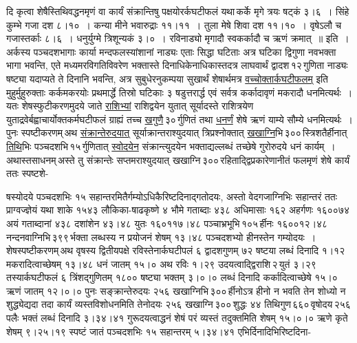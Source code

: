 \documentclass[11pt, openany]{book}
\begin{document}
\newpage

\begin{sloppypar}
\noindent दि कृत्वा शेषैस्तिथिवद्धनमृणं वा कार्यं संक्रान्तिषु पक्षयोरर्कघटीफलं यथा\textendash \,कर्के मृगे त्रयः षट्कं ३।६~। सिंहे कुम्भे गजा दश ८।१०~। कन्या मीने भवारुद्राः ११।११~। तुला मेषे शिवा दश ११।१०~। वृषेऽलौ च गजास्तर्काः ८।६~। धनुर्युग्मे त्रिशून्यकं ३।०~। रविनाड्यो मृगादौ स्वकर्कादौ च ऋणं क्रमात्~॥ इति~। अर्कस्य पञ्चदशभागाः कार्या मन्दफलस्यांशानां नाड्यः एताः सिद्धा घटिताः अत्र घटिका द्विगुणा नवभक्ता भागा भवन्ति, एते मध्यमरविगतिविवरेण भक्तास्ते दिनाधिकेनाधिकास्तदत्र लाघवार्थं द्वादश\textendash \,१२\textendash \,गुणिता नाड्यः षष्ट्या यदाप्यते ते दिनानि भवन्ति, अत्र सुबुधेरनुकम्पया सुखार्थं शेषार्थमत्र \hyperref[6.2]{वच्चोक्तार्कघटीफलम्} इति मुहुर्मुहुरुक्ताः कर्कमकरयोः प्रथमार्द्धे तिस्रो घटिकाः ३ षडुत्तरार्द्ध एवं सर्वत्र कर्कादावृणं मकरादौ धनमित्यर्थः~। यतः शेषस्फुटीकरणमुदये जाते \hyperref[6.2]{राशिभ्यां} राशिद्वयेन युतात् सूर्यादस्ते राशित्रयेण युताद्रवेर्बह्वाचार्योक्तकर्मघटीफलं ग्राह्यं तच्च \hyperref[6.2]{खगुणै}\textendash \,३०\textendash \,र्गुणितं तथा \hyperref[6.2]{धनर्णं} शेषे ऋणं याम्ये सौम्ये धनमित्यर्थः~। पुनः स्पष्टीकरणम्\textendash \,अथ \hyperref[6.2]{संक्रान्तेरुदयात्} सूर्याक्रान्तराश्युदयात् त्रिप्रश्नोक्तात् \hyperref[6.2]{खखाग्नि}भि\textendash \,३००\textendash \,स्त्रिशतैर्हीनात् \hyperref[6.2]{तिथि}भिः पञ्चदशभि\textendash \,१५\textendash \,र्गुणितात् \hyperref[6.2]{स्वोदयेन} संक्रान्त्युदयेन भक्ताद्यल्लब्धं तच्छेषे गुरोरुदये धनं कार्यम्~। अथास्तसाधनम्\textendash \,अस्ते तु संक्रान्तेः सप्तमराश्युदयात् खखाग्नि\textendash \,३००\textendash \,रहिताद्द्विप्रकारेणानीतं फलमृणं शेषे कार्यं ततः स्पष्टशे-
\end{sloppypar}

\newpage

\begin{sloppypar}
\noindent षस्योदये पञ्चदशभिः १५ सहान्तरमितैर्गम्योऽधिकैरिष्टदिनाद्गतोदयः, अस्तो वेदगजाग्निभिः सहान्तरं ततः प्राग्वज्ज्ञेयं यथा शाके १५४३ लौकिका-षाढकृष्णे ४ भौमे गताब्दाः ४३८ अधिमासाः १६२ अहर्गणः १६००७४ अयं गताब्दानां ४३८ दशांशेन ४३।४८ युतः १६०११७।४८ पञ्चाभ्रभूभि\textendash \,१०५\textendash \,र्हीनः १६००१२।४८ नन्दनवाग्निभि\textendash \,३९९\textendash \,र्भक्ता लब्धस्य न प्रयोजनं शेषम् १३।४८ पञ्चदशभ्यो हीनस्तेन गम्योदयः~। शेषस्पष्टीकरणम्\textendash \,अथ वृषस्य द्वितीयपक्षे रविस्तेनार्कघटीपलं ६ द्वादशगुणम् ७२ षष्टया लब्धं दिनादि १।१२ मकरादित्वाच्छेषम् १३।४८ धनं जातम् १५।० अथ रविः १।२९ उदयत्वाद्द्विराशि\textendash \,२\textendash \,युतं ३।२९ तस्यार्कघटीफलं ६ त्रिंशद्गुणितम् १८०० षष्ट्या भक्तम् ३।०।० लब्धं दिनादि कर्कादित्वाच्छेषे १५।० ऋणं जातम् १२।०।० पुनः सङ्क्रान्तेरुदयः २५६ खखाग्निभि\textendash \,३००\textendash \,र्हीनोऽत्र हीनो न भवति तेन शोध्यो न शुद्ध्येद्यदा तदा कार्यं व्यस्तविशोधनमिति तेनोदयः २५६ खखाग्नि\textendash \,३००\textendash \,शुद्धः ४४ तिथिगुण\textendash \,६६०\textendash \,वृषोदय\textendash \,२५६\textendash \,पलैः भक्तं लब्धं दिनादि ३।३४।४१ गुरूदयत्वाद्धनं शेषं परं व्यस्तं तदुक्तमिति शेषम् १५।०।० ऋणे कृते शेषम् ९।२५।१९ स्पष्टं जातं पञ्चदशभिः १५ सहान्तरम् ५।३४।४१ एभिर्दिनादिभिरिष्टदिना-
\end{sloppypar}
\end{document}

